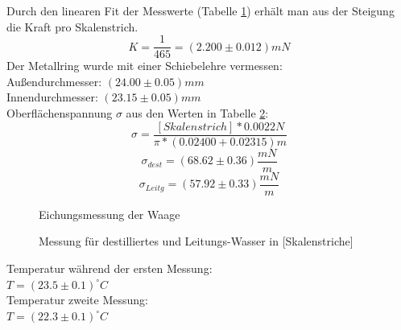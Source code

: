 \documentclass[12pt,a4paper]{article}
\begin{document}
\begin{multicols}{2}


\noindent
Durch den linearen Fit der Messwerte (Tabelle \ref{fig:oberflaeche_eichung}) erhält man aus der Steigung die Kraft pro Skalenstrich. 
$$K = \frac{1}{465} = (2.200\pm 0.012)mN$$ 
Der Metallring wurde mit einer Schiebelehre vermessen:\\
Außendurchmesser: $(24.00 \pm 0.05)mm$\\
Innendurchmesser: $(23.15 \pm 0.05)mm$\\
Oberflächenspannung $\sigma$ aus den Werten in Tabelle \ref{fig:oberflaeche_messung}:
$$\sigma = \frac{[Skalenstrich] * 0.0022N}{\pi * (0.02400 + 0.02315)m} $$ 
$$\sigma_{dest}= (68.62 \pm 0.36) \frac{mN}{m}$$ %
$$ \sigma_{Leitg} = (57.92 \pm 0.33) \frac{mN}{m}$$





\begin{figure}[H]
	\centering
	\caption{Eichungsmessung der Waage}
	\label{fig:oberflaeche_eichung}
\end{figure}
\noindent

\begin{figure}[H]
	\centering
	\caption{Messung für destilliertes und Leitungs-Wasser in [Skalenstriche]}
	\label{fig:oberflaeche_messung}
\end{figure}

\noindent
Temperatur während der ersten Messung:\\
\indent$T=(23.5 \pm 0.1)^{\circ}C$\\
Temperatur zweite Messung:\\
\indent$T=(22.3 \pm 0.1)^{\circ}C$\\


\end{multicols}
\end{document}
